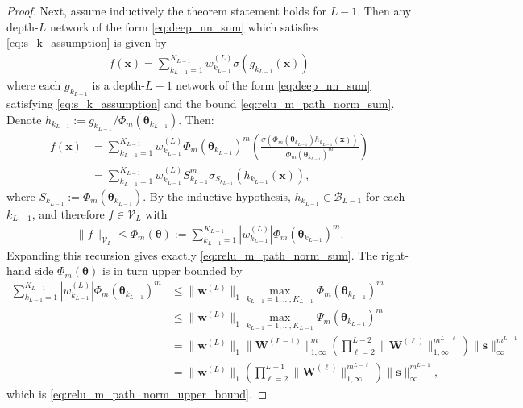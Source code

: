 \documentclass{article}
\def\vtheta{{\bm{\theta}}}
\def\vs{{\bm{s}}}
\def\vw{{\bm{w}}}
\def\vx{{\bm{x}}}
\def\mW{{\bm{W}}}
\def\cB{{\mathcal{B}}}
\def\cV{{\mathcal{V}}}
\begin{document}
\begin{appendices}
\begin{proof}
    Next, assume inductively the theorem statement holds for $L-1$. Then any depth-$L$ network of the form \eqref{eq:deep_nn_sum} which satisfies \eqref{eq:s_k_assumption} is given by
    \begin{align}
        f(\vx) = \sum_{k_{L-1}=1}^{K_{L-1}} w_{k_{L-1}}^{(L)} \sigma( g_{k_{L-1}} (\vx))
    \end{align}
    where each $g_{k_{L-1}}$ is a depth-$L-1$ network of the form \eqref{eq:deep_nn_sum} satisfying \eqref{eq:s_k_assumption} and the bound \eqref{eq:relu_m_path_norm_sum}. Denote $h_{k_{L-1}} := g_{k_{L-1}}/ \Phi_m(\vtheta_{k_{L-1}})$. Then:
    \begin{align}
        f(\vx) &= \sum_{k_{L-1}=1}^{K_{L-1}} w_{k_{L-1}}^{(L)} \Phi_m(\vtheta_{k_{L-1}})^m \left( \frac{\sigma \left(  \Phi_m(\vtheta_{k_{L-1}}) h_{k_{L-1}} (\vx) \right)}{\Phi_m(\vtheta_{k_{L-1}})^m} \right) \\
        &= \sum_{k_{L-1}=1}^{K_{L-1}} w_{k_{L-1}}^{(L)} S_{k_{L-1}}^m \sigma_{S_{k_{L-1}}} (h_{k_{L-1}}(\vx)),
    \end{align}
    where $S_{k_{L-1}} := \Phi_m(\vtheta_{k_{L-1}})$. By the inductive hypothesis, $ h_{k_{L-1}} \in \cB_{L-1}$ for each $k_{L-1}$, and therefore $f \in \cV_L$ with
    \begin{align}
        \| f \|_{\cV_L} \leq \Phi_m(\vtheta) :=  \sum_{k_{L-1}=1}^{K_{L-1}} \left| w_{k_{L-1}}^{(L)} \right| \Phi_m(\vtheta_{k_{L-1}})^m.
    \end{align}
    Expanding this recursion gives exactly \eqref{eq:relu_m_path_norm_sum}. The right-hand side $\Phi_m(\vtheta)$ is in turn upper bounded by
    \begin{align}
        \sum_{k_{L-1}=1}^{K_{L-1}} \left| w_{k_{L-1}}^{(L)} \right| \Phi_m(\vtheta_{k_{L-1}})^m &\leq \| \vw^{(L)} \|_1 \max_{k_{L-1}=1, \dots, K_{L-1}} \Phi_m(\vtheta_{k_{L-1}})^m \\
        &\leq \| \vw^{(L)} \|_1 \max_{k_{L-1}=1, \dots, K_{L-1}} \Psi_m(\vtheta_{k_{L-1}})^m \\
        &= \| \vw^{(L)} \|_1 \| \mW^{(L-1)} \|_{1,\infty}^{m} \left( \prod_{\ell=2}^{L-2} \| \mW^{(\ell)} \|_{1,\infty}^{m^{L-\ell}} \right) \| \vs \|_\infty^{m^{L-1}} \\
        &= \| \vw^{(L)} \|_1 \left( \prod_{\ell=2}^{L-1} \| \mW^{(\ell)} \|_{1,\infty}^{m^{L-\ell}} \right) \| \vs \|_\infty^{m^{L-1}},
    \end{align}
    which is \eqref{eq:relu_m_path_norm_upper_bound}.
    

\end{proof}
\end{appendices}
\end{document}
